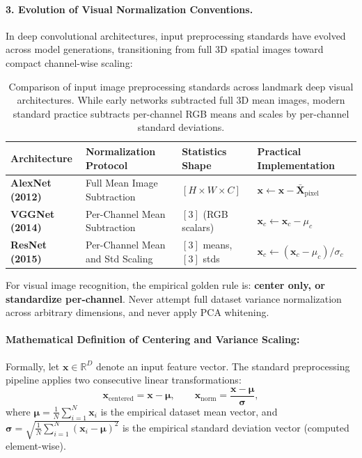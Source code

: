 \paragraph{3. Evolution of Visual Normalization Conventions.}
In deep convolutional architectures, input preprocessing standards have evolved across model generations, transitioning from full 3D spatial images toward compact channel-wise scaling:
\begin{table}[H]
\centering
\small
\begin{tabular}{@{}llll@{}}
\toprule
\textbf{Architecture} & \textbf{Normalization Protocol} & \textbf{Statistics Shape} & \textbf{Practical Implementation} \\ \midrule
\textbf{AlexNet (2012)} & Full Mean Image Subtraction & $[H \times W \times C]$ & $\mathbf{x} \leftarrow \mathbf{x} - \bar{\mathbf{X}}_{\text{pixel}}$ \\
\textbf{VGGNet (2014)} & Per-Channel Mean Subtraction & $[3]$ (RGB scalars) & $\mathbf{x}_c \leftarrow \mathbf{x}_c - \mu_c$ \\
\textbf{ResNet (2015)} & Per-Channel Mean and Std Scaling & $[3]$ means, $[3]$ stds & $\mathbf{x}_c \leftarrow (\mathbf{x}_c - \mu_c) / \sigma_c$ \\ \bottomrule
\end{tabular}
\caption{Comparison of input image preprocessing standards across landmark deep visual architectures. While early networks subtracted full 3D mean images, modern standard practice subtracts per-channel RGB means and scales by per-channel standard deviations.}
\label{tab:cnn_preprocessing_standards}
\end{table}

\begin{examinsight}
For visual image recognition, the empirical golden rule is: \textbf{center only, or standardize per-channel}. Never attempt full dataset variance normalization across arbitrary dimensions, and never apply PCA whitening.
\end{examinsight}

\paragraph{Mathematical Definition of Centering and Variance Scaling:}
Formally, let $\mathbf{x} \in \mathbb{R}^D$ denote an input feature vector. The standard preprocessing pipeline applies two consecutive linear transformations:
\begin{equation}
\mathbf{x}_{\text{centered}} = \mathbf{x} - \boldsymbol{\mu}, \qquad \mathbf{x}_{\text{norm}} = \frac{\mathbf{x} - \boldsymbol{\mu}}{\boldsymbol{\sigma}},
\label{eq:centering_and_scaling}
\end{equation}
where $\boldsymbol{\mu} = \frac{1}{N}\sum_{i=1}^N \mathbf{x}_i$ is the empirical dataset mean vector, and $\boldsymbol{\sigma} = \sqrt{\frac{1}{N}\sum_{i=1}^N (\mathbf{x}_i - \boldsymbol{\mu})^2}$ is the empirical standard deviation vector (computed element-wise).

